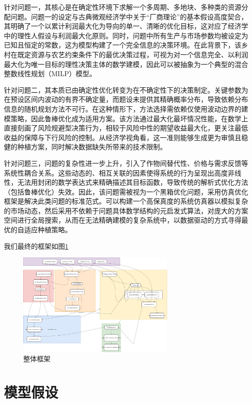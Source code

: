 针对问题一，其核心是在确定性环境下求解一个多周期、多地块、多种类的资源分配问题。问题一的设定与古典微观经济学中关于“厂商理论”的基本假设高度契合，其明确了一个以累计利润最大化为导向的单一、清晰的优化目标，这对应了经济学中的理性人假设与利润最大化原则。同时，问题中所有生产与市场参数均被设定为已知且恒定的常数，这为模型构建了一个完全信息的决策环境。在此背景下，该乡村在既定资源与农艺约束条件下的最优决策过程，可视为对一个信息完全、以利润最大化为唯一目标的理性决策主体的数学建模，因此可以被抽象为一个典型的混合整数线性规划（MILP）模型。

针对问题二，其本质已由确定性优化转变为在不确定性下的决策制定。关键参数为在预设区间内波动的有界不确定量，而题设未提供其精确概率分布，导致依赖分布信息的随机规划方法不可行。在这种情形下，方法选择需依赖仅使用波动边界的建模策略，因此鲁棒优化成为适用方案。该方法通过最大化最坏情况性能，在数学上直接刻画了风险规避型决策行为，相较于风险中性的期望收益最大化，更关注最低收益的保障与下行风险的控制。从经济学视角看，这一准则能够生成更为审慎且稳健的种植方案，同时解决数据缺失所带来的技术限制。

针对问题三，问题的复杂性进一步上升，引入了作物间替代性、价格与需求反馈等系统性耦合关系。这些动态的、相互关联的因素使得系统的行为呈现出高度非线性，无法用封闭的数学表达式来精确描述其目标函数，导致传统的解析式优化方法（包括鲁棒优化）失效。因此，该问题需被视为一个黑箱优化问题，采用仿真优化框架是解决此类问题的标准范式。可以构建一个高保真度的系统仿真器以模拟复杂的市场动态，然后采用不依赖于问题具体数学结构的元启发式算法，对庞大的方案空间进行全局搜索，从而在无法精确建模的复杂系统中，以数据驱动的方式寻得最优的自适应种植策略。

我们最终的框架如图\ref{fig:all}

\begin{figure}[htbp]
	\centering
	\includegraphics[width=0.7\textwidth]{../figures/all.png}
	\caption{整体框架}
	\label{fig:all}
\end{figure}


\section{模型假设}


